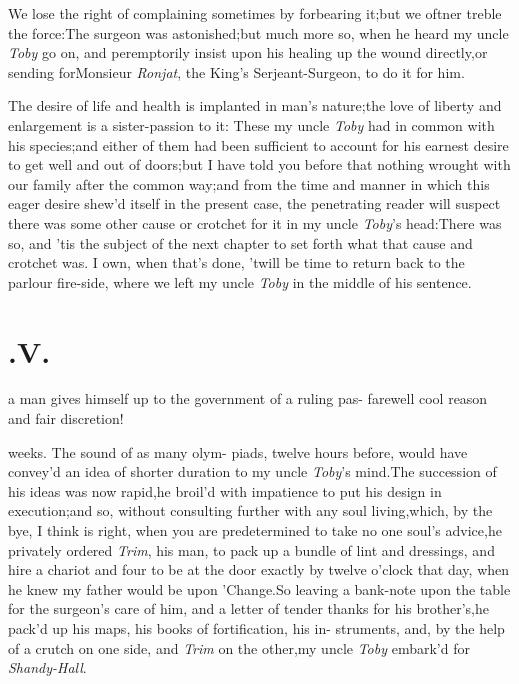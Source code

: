 \documentclass{article}
\begin{document}
\tsk We lose the right of complaining sometimes by forbearing
it;\tsk but we oftner treble the force:\tsk The surgeon was
astonished;\tsk but much more so, when he heard my uncle \textit{Toby} go on,
and peremptorily insist upon his healing up the wound
directly,\tsh or sending for\break Monsieur \textit{Ronjat}, the
King’s Serjeant-\break Surgeon, to do it for him.

The desire of life and health is implanted in man’s
nature;\tsh the love of liberty and enlargement is a
sister-passion to it: These my uncle \textit{Toby} had in common with
his species;\tsk and either of them had been sufficient to account for his earnest
desire to get well and out of doors;\tsk but I have told
you before that nothing wrought with our family after the common
way;\tsh and from the time and manner in which this eager
desire shew’d itself in the present case, the penetrating reader
will suspect there was some other cause or crotchet for it in my
uncle \textit{Toby}’s head:\tsk There was so, and
’tis the subject of the next chapter to set forth what that
cause and crotchet was. I own, when that’s done, ’twill
be time to return back to the parlour fire-side, where we left my
uncle \textit{Toby} in the middle of his sentence.

\bigskip

\section{.\enspace  V.}

 a man gives himself up to\break 
the government of a ruling pas-\break
{}
farewell cool reason and fair discretion!

\noindent
{}
weeks. The sound of as many olym-\break
piads, twelve hours before, would have
convey’d an idea of shorter duration to my uncle
\textit{Toby}’s mind.\tsh The succession of his ideas
was now rapid,\tsk he broil’d with impatience to put his design
in execution;\tsk and so, without consulting further with
any soul living,\tsk which, by the bye, I think is right, when
you are predetermined to take no one soul’s
advice,\tsk he privately ordered \textit{Trim}, his man, to
pack up a bundle of lint and dressings, and hire a chariot and four
to be at the door exactly by twelve o’clock that day, when he
knew my father would be upon ’Change.\tsk So leaving
a bank-note upon the table for the surgeon’s care of him, and
a letter of tender thanks\break 
for his brother’s,\tsk he pack’d up his\break
maps, his books of fortification, his in-\break
struments, \etc\tsk and, by the help of a
crutch on one side, and \textit{Trim} on the\break
other,\tsh my uncle \textit{Toby} embark’d for\break
\textit{Shandy-Hall}.
\end{document}
